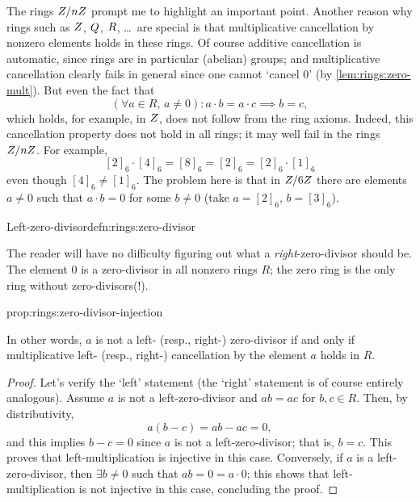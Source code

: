 The rings $Z/nZ$ prompt me to highlight an important point. Another
reason why rings such as $Z$, $Q$, $R$, \dots\ are special is that
multiplicative cancellation by nonzero elements holds in these
rings. Of course additive cancellation is automatic, since rings are
in particular (abelian) groups; and multiplicative cancellation
clearly fails in general since one cannot `cancel $0$' (by
\cref{lem:rings:zero-mult}). But even the fact that
\[
  (\forall a \in R,\, a \neq 0) : a \cdot b = a \cdot c \implies b =
  c,
\]
which holds, for example, in $Z$, does not follow from the ring
axioms.  Indeed, this cancellation property does not hold in all
rings; it may well fail in the rings $Z/nZ$. For example,
\[ [2]_6 \cdot [4]_6 = [8]_6 = [2]_6 = [2]_6 \cdot [1]_6
\]
even though $[4]_6 \neq [1]_6$.  The problem here is that in $Z/6Z$
there are elements $a \neq 0$ such that $a \cdot b = 0$ for some
$b \neq 0$ (take $a = [2]_6$, $b = [3]_6$).
\begin{defn}{Left-zero-divisor}{defn:rings:zero-divisor}
\end{defn}
The reader will have no difficulty figuring out what a
\emph{right}-zero-divisor should be. The element $0$ is a zero-divisor
in all nonzero rings $R$; the zero ring is the only ring without
zero-divisors(!).
\begin{prop}{}{prop:rings:zero-divisor-injection}
\end{prop}
In other words, $a$ is not a left- (resp., right-) zero-divisor if and
only if multiplicative left- (resp., right-) cancellation by the
element $a$ holds in $R$.
\begin{proof}
  Let's verify the `left' statement (the `right' statement is of
  course entirely analogous). Assume $a$ is not a left-zero-divisor
  and $ab = ac$ for $b, c \in R$.  Then, by distributivity,
  \[
    a(b - c) = ab - ac = 0,
  \]
  and this implies $b - c = 0$ since $a$ is not a left-zero-divisor;
  that is, $b = c$. This proves that left-multiplication is injective
  in this case.  Conversely, if $a$ is a left-zero-divisor, then
  $\exists b \neq 0$ such that $ab = 0 = a \cdot 0$; this shows that
  left-multiplication is not injective in this case, concluding the
  proof.
\end{proof}
